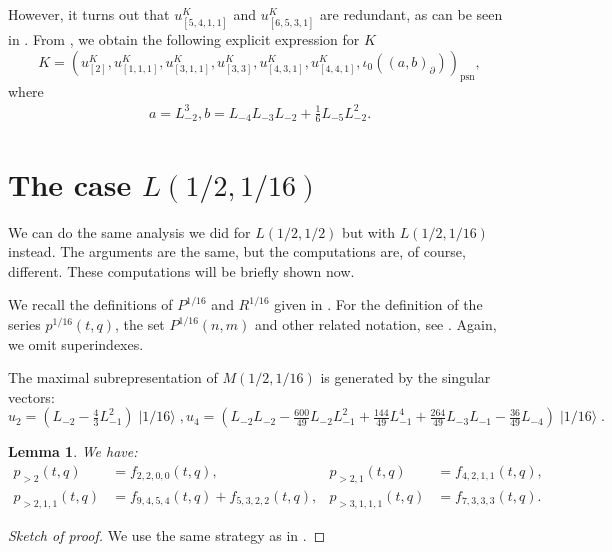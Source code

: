 \documentclass[a4paper, 12pt, reqno]{amsart}
\newtheorem{lemma}[theorem]{Lemma}
\theoremstyle{remark}
\DeclareMathOperator{\psn}{psn}
\DeclareMathOperator{\vacsixteen}{|1/16\rangle}
\begin{document}
However, it turns out that $u^K_{[5, 4, 1, 1]}$ and $u^K_{[6, 5, 3, 1]}$ are redundant, as can be seen in \cite[m11-m15.ipynb]{sagemath2}.
From \cite[Theorem 2]{andrews_singular_2022}, we obtain the following explicit expression for $K$
\begin{equation*}
  K = (u^K_{[2]}, u^K_{[1, 1, 1]}, u^K_{[3, 1, 1]}, u^K_{[3, 3]}, u^K_{[4, 3, 1]}, u^K_{[4, 4, 1]}, \iota_0((a, b)_{\partial}))_{\psn},
\end{equation*}
where
\begin{align*}
  a = L_{-2}^3, b = L_{-4}L_{-3}L_{-2} + \tfrac{1}{6}L_{-5}L_{-2}^2.
\end{align*}

\section{The case $L(1/2, 1/16)$}
\label{sec:case-l12-116}

We can do the same analysis we did for $L(1/2, 1/2)$ but with $L(1/2, 1/16)$ instead.
The arguments are the same, but the computations are, of course, different.
These computations will be briefly shown now.

We recall the definitions of $P^{1/16}$ and $R^{1/16}$ given in .
For the definition of the series $p^{1/16}(t, q)$, the set $P^{1/16}(n, m)$ and other related notation, see .
Again, we omit superindexes.

The maximal subrepresentation of $M(1/2, 1/16)$ is generated by the singular vectors:
\begin{equation*}
  u_2 = (L_{-2} - \tfrac{4}{3}L_{-1}^2)\vacsixteen, u_4 = (L_{-2}L_{-2} - \tfrac{600}{49}L_{-2}L_{-1}^2 + \tfrac{144}{49}L_{-1}^4 + \tfrac{264}{49}L_{-3}L_{-1} - \tfrac{36}{49}L_{-4})\vacsixteen.
\end{equation*}

\begin{lemma}
  \label{lmm:12}
  We have:
  \begin{align*}
    p_{>2}(t, q) &= f_{2, 2, 0, 0}(t, q), &p_{>2, 1}(t, q) &= f_{4, 2, 1, 1}(t, q), \\
    p_{>2, 1, 1}(t, q) &= f_{9, 4, 5, 4}(t, q) + f_{5, 3, 2, 2}(t, q), &p_{>3, 1, 1, 1}(t, q) &= f_{7, 3, 3, 3}(t, q).
  \end{align*}
\end{lemma}

\begin{proof}[Sketch of proof]
  We use the same strategy as in .
\end{proof}
\end{document}
